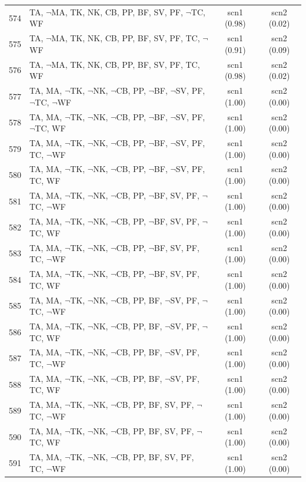 \documentclass[12pt]{article}
\begin{document}
\begin{longtable}{|l|l|c|c|}
574 & TA, $\neg$MA, TK, NK, CB, PP, BF, SV, PF, $\neg$TC, WF & scn1 (0.98) & scn2 (0.02)\\
575 & TA, $\neg$MA, TK, NK, CB, PP, BF, SV, PF, TC, $\neg$WF & scn1 (0.91) & scn2 (0.09)\\
576 & TA, $\neg$MA, TK, NK, CB, PP, BF, SV, PF, TC, WF & scn1 (0.98) & scn2 (0.02)\\
577 & TA, MA, $\neg$TK, $\neg$NK, $\neg$CB, PP, $\neg$BF, $\neg$SV, PF, $\neg$TC, $\neg$WF & scn1 (1.00) & scn2 (0.00)\\
578 & TA, MA, $\neg$TK, $\neg$NK, $\neg$CB, PP, $\neg$BF, $\neg$SV, PF, $\neg$TC, WF & scn1 (1.00) & scn2 (0.00)\\
579 & TA, MA, $\neg$TK, $\neg$NK, $\neg$CB, PP, $\neg$BF, $\neg$SV, PF, TC, $\neg$WF & scn1 (1.00) & scn2 (0.00)\\
580 & TA, MA, $\neg$TK, $\neg$NK, $\neg$CB, PP, $\neg$BF, $\neg$SV, PF, TC, WF & scn1 (1.00) & scn2 (0.00)\\
581 & TA, MA, $\neg$TK, $\neg$NK, $\neg$CB, PP, $\neg$BF, SV, PF, $\neg$TC, $\neg$WF & scn1 (1.00) & scn2 (0.00)\\
582 & TA, MA, $\neg$TK, $\neg$NK, $\neg$CB, PP, $\neg$BF, SV, PF, $\neg$TC, WF & scn1 (1.00) & scn2 (0.00)\\
583 & TA, MA, $\neg$TK, $\neg$NK, $\neg$CB, PP, $\neg$BF, SV, PF, TC, $\neg$WF & scn1 (1.00) & scn2 (0.00)\\
584 & TA, MA, $\neg$TK, $\neg$NK, $\neg$CB, PP, $\neg$BF, SV, PF, TC, WF & scn1 (1.00) & scn2 (0.00)\\
585 & TA, MA, $\neg$TK, $\neg$NK, $\neg$CB, PP, BF, $\neg$SV, PF, $\neg$TC, $\neg$WF & scn1 (1.00) & scn2 (0.00)\\
586 & TA, MA, $\neg$TK, $\neg$NK, $\neg$CB, PP, BF, $\neg$SV, PF, $\neg$TC, WF & scn1 (1.00) & scn2 (0.00)\\
587 & TA, MA, $\neg$TK, $\neg$NK, $\neg$CB, PP, BF, $\neg$SV, PF, TC, $\neg$WF & scn1 (1.00) & scn2 (0.00)\\
588 & TA, MA, $\neg$TK, $\neg$NK, $\neg$CB, PP, BF, $\neg$SV, PF, TC, WF & scn1 (1.00) & scn2 (0.00)\\
589 & TA, MA, $\neg$TK, $\neg$NK, $\neg$CB, PP, BF, SV, PF, $\neg$TC, $\neg$WF & scn1 (1.00) & scn2 (0.00)\\
590 & TA, MA, $\neg$TK, $\neg$NK, $\neg$CB, PP, BF, SV, PF, $\neg$TC, WF & scn1 (1.00) & scn2 (0.00)\\
591 & TA, MA, $\neg$TK, $\neg$NK, $\neg$CB, PP, BF, SV, PF, TC, $\neg$WF & scn1 (1.00) & scn2 (0.00)\\

\end{longtable}
\end{document}
